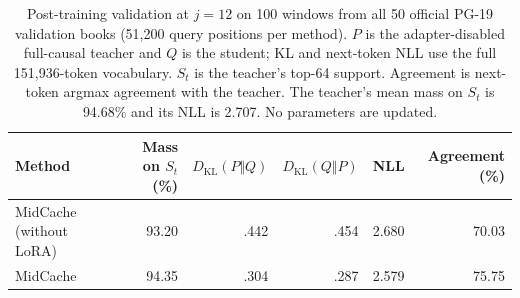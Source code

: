 \begin{table}[htbp]
\centering
\small
\setlength{\tabcolsep}{4pt}
\begin{tabular}{@{}lrrrrr@{}}
\toprule
Method & Mass on $S_t$ (\%) & $D_{\mathrm{KL}}(P\Vert Q)$ & $D_{\mathrm{KL}}(Q\Vert P)$ & NLL & Agreement (\%) \\
\midrule
MidCache (without LoRA) & 93.20 & .442 & .454 & 2.680 & 70.03 \\
MidCache & 94.35 & .304 & .287 & 2.579 & 75.75 \\
\bottomrule
\end{tabular}
\caption{Post-training validation at $j=12$ on 100 windows from all 50 official PG-19 validation books (51,200 query positions per method). $P$ is the adapter-disabled full-causal teacher and $Q$ is the student; KL and next-token NLL use the full 151,936-token vocabulary. $S_t$ is the teacher's top-64 support. Agreement is next-token argmax agreement with the teacher. The teacher's mean mass on $S_t$ is 94.68\% and its NLL is 2.707. No parameters are updated.}
\label{tab:distillation-validation}
\end{table}
